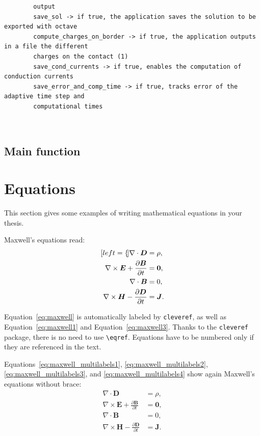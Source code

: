 \documentclass[11pt,a4paper]{article}
\begin{document}
\begin{minipage}{\textwidth}
	\vspace{3mm}
	\small
	\begin{verbatim}
		output
		save_sol -> if true, the application saves the solution to be exported with octave
		compute_charges_on_border -> if true, the application outputs in a file the different
		charges on the contact (1)
		save_cond_currents -> if true, enables the computation of conduction currents
		save_error_and_comp_time -> if true, tracks error of the adaptive time step and
		computational times
	\end{verbatim}
\end{minipage}\\

\subsection{Main function}
\section{Equations}
\label{sec:eqs}
This section gives some examples of writing mathematical equations in your thesis.

Maxwell's equations read:
\begin{subequations}
    \label{eq:maxwell}
    \begin{align}[left=\empheqlbrace]
    \nabla\cdot \bm{D} & = \rho, \label{eq:maxwell1} \\
    \nabla \times \bm{E} +  \frac{\partial \bm{B}}{\partial t} & = \bm{0}, \label{eq:maxwell2} \\
    \nabla\cdot \bm{B} & = 0, \label{eq:maxwell3} \\
    \nabla \times \bm{H} - \frac{\partial \bm{D}}{\partial t} &= \bm{J}. \label{eq:maxwell4}
    \end{align}
\end{subequations}

Equation~\eqref{eq:maxwell} is automatically labeled by \texttt{cleveref},
as well as Equation~\eqref{eq:maxwell1} and Equation~\eqref{eq:maxwell3}.
Thanks to the \verb|cleveref| package, there is no need to use \verb|\eqref|.
Equations have to be numbered only if they are referenced in the text.

Equations~\eqref{eq:maxwell_multilabels1}, \eqref{eq:maxwell_multilabels2}, \eqref{eq:maxwell_multilabels3}, and \eqref{eq:maxwell_multilabels4} show again Maxwell's equations without brace:
\begin{align}
    \nabla\cdot \bm{D} & = \rho, \label{eq:maxwell_multilabels1} \\
    \nabla \times \bm{E} +  \frac{\partial \bm{B}}{\partial t} &= \bm{0}, \label{eq:maxwell_multilabels2} \\
    \nabla\cdot \bm{B} & = 0, \label{eq:maxwell_multilabels3} \\
    \nabla \times \bm{H} - \frac{\partial \bm{D}}{\partial t} &= \bm{J} \label{eq:maxwell_multilabels4}.
\end{align}
\end{document}
